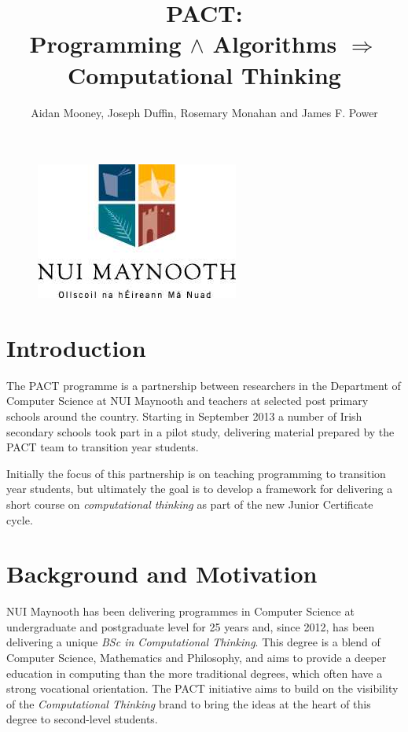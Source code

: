 \documentclass[a4paper]{article}
\begin{document}
\title{PACT: \\ {\large Programming ${\land}$ Algorithms $\Rightarrow$ Computational Thinking}}

\author{Aidan Mooney, Joseph Duffin, Rosemary Monahan and James F. Power}

\begin{figure}\centering
\includegraphics[height=.2\textheight]{nuim_large.jpg}
\end{figure}

\maketitle

\section{Introduction}
The PACT programme is a partnership between researchers in the Department of Computer Science at NUI Maynooth and teachers at selected post primary schools around the country.   Starting in September 2013 a number of Irish secondary schools took part in a pilot study, delivering material prepared by the PACT team to transition year students.

Initially the focus of this partnership is on teaching programming to transition year students, but ultimately the goal is to develop a framework for delivering a short course on \textit{computational thinking} as part of the new Junior Certificate cycle.


\section{Background and Motivation} \label{Background}

NUI Maynooth has been delivering programmes in Computer Science at undergraduate and postgraduate level for 25 years and, since 2012, has been delivering a unique \textit{BSc in Computational Thinking}.  This degree is a blend of Computer Science, Mathematics and Philosophy, and aims to provide a deeper education in computing than the more traditional degrees, which often have a strong vocational orientation.  The PACT initiative aims to build on the visibility of the \textit{Computational Thinking} brand to bring the ideas at the heart of this degree to second-level students.
\end{document}

